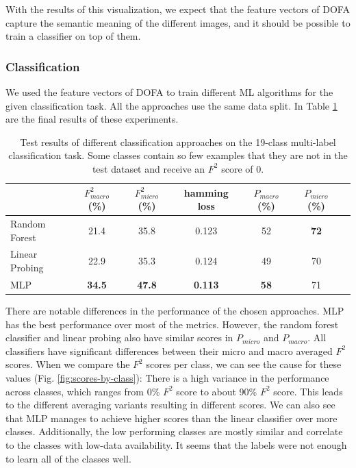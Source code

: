 With the results of this visualization, we expect that the feature vectors of DOFA capture the semantic meaning of the different images, and it should be possible to train a classifier on top of them.

\subsubsection{Classification}

We used the feature vectors of DOFA to train different ML algorithms for the given classification task. All the approaches use the same data split. In Table \ref{fig:test-results} are the final results of these experiments.

\begin{table}[h]
  \centering
  \begin{tabular}{lcccccc}
    \textbf{} & \textbf{$F^2_{macro}$ (\%)} & \textbf{$F^2_{micro}$ (\%)} & \textbf{hamming loss} & \textbf{$P_{macro}$ (\%)} & \textbf{$P_{micro}$ (\%)} \\
    \hline
    Random Forest & 21.4 & 35.8 & 0.123 & 52 & \textbf{72} \\
    Linear Probing & 22.9 & 35.3 & 0.124 & 49 & 70 \\
    MLP & \textbf{34.5} & \textbf{47.8} & \textbf{0.113} & \textbf{58} & 71 \\
  \end{tabular}
  \caption{Test results of different classification approaches on the 19-class multi-label classification task. Some classes contain so few examples that they are not in the test dataset and receive an $F^2$ score of 0.}
  \label{fig:test-results}
\end{table}

There are notable differences in the performance of the chosen approaches. MLP has the best performance over most of the metrics. However, the random forest classifier and linear probing also have similar scores in $P_{micro}$ and $P_{macro}$. All classifiers have significant differences between their micro and macro averaged $F^2$ scores. When we compare the $F^2$ scores per class, we can see the cause for these values (Fig. \ref{fig:scores-by-class}): There is a high variance in the performance across classes, which ranges from 0\% $F^2$ score to about 90\% $F^2$ score. This leads to the different averaging variants resulting in different scores. We can also see that MLP manages to achieve higher scores than the linear classifier over more classes. Additionally, the low performing classes are mostly similar and correlate to the classes with low-data availability. It seems that the labels were not enough to learn all of the classes well.


